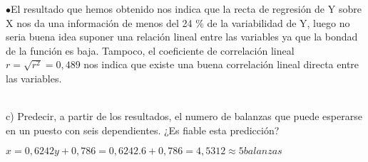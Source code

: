 \documentclass{article}
\begin{document}
		$\bullet$El resultado que hemos obtenido nos indica que la recta de regresión de Y sobre X nos da una información de menos
	del 24 \% de la variabilidad de Y, luego no seria buena idea suponer una relación lineal entre las variables ya que la bondad de la función es baja. 
	Tampoco, el coeficiente de correlación lineal $r =\sqrt{r^{2}} = 0,489$ nos indica que existe una buena correlación lineal directa entre las variables. \\ \\
	
	\begin{flushleft}
		c) Predecir, a partir de los resultados, el numero de balanzas que puede esperarse en un puesto
	con seis dependientes. ¿Es fiable esta predicción?

	\end{flushleft}
	$x = 0,6242y +  0,786 = 0,6242 . 6 +  0,786 = 4,5312 \approx 5 balanzas $
	
	
	
	
	
	
\end{document}
